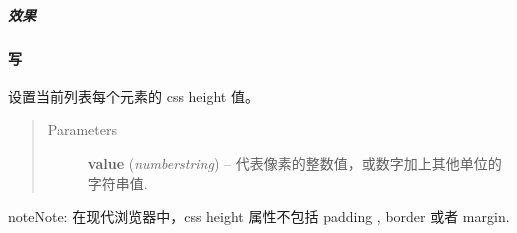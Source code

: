 \documentclass[letterpaper,10pt,english]{sphinxmanual}
\begin{document}
\subparagraph{效果}
\label{api/core/node/height:id3}

\paragraph{写}
\label{api/core/node/height:id4}

\begin{fulllineitems}
设置当前列表每个元素的 css height 值。
\begin{quote}\begin{description}
\item[{Parameters}] \leavevmode
\textbf{value} (\emph{number\textbar{}string}) -- 代表像素的整数值，或数字加上其他单位的字符串值.

\end{description}\end{quote}

\end{fulllineitems}


\begin{notice}{note}{Note:}
在现代浏览器中，css height 属性不包括 padding , border 或者 margin.
\end{notice}
\end{document}
